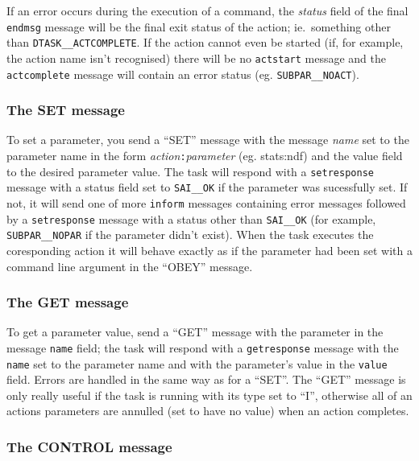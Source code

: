 \documentclass[twoside,11pt,nolof]{starlink}
\begin{document}
If an error occurs during the execution of a command, the \emph{status} field
of the final \texttt{endmsg} message will be the final exit status of the action;
ie.\ something other than \texttt{DTASK\_\_ACTCOMPLETE}. If the action cannot even
be started (if, for example, the action name isn't recognised) there will be
no \texttt{actstart} message and the \texttt{actcomplete} message will contain an
error status (eg. \texttt{SUBPAR\_\_NOACT}).

\subsubsection{The SET message}

To set a parameter, you send a ``SET'' message with the message \emph{name} set to the parameter name in the form \emph{action}{\tt{:}}\emph{parameter} (eg.  stats:ndf) and the value field to the desired
parameter value. The task will respond with a \texttt{setresponse} message
with a status field set to \texttt{SAI\_\_OK} if the parameter was
sucessfully set.  If not, it will send one of more \texttt{inform}
messages containing error messages followed by a \texttt{setresponse}
message with a status other than \texttt{SAI\_\_OK} (for example, \texttt{SUBPAR\_\_NOPAR} if the parameter didn't exist). When the task executes
the coresponding action it will behave exactly as if the parameter had
been set with a command line argument in the ``OBEY'' message.

\subsubsection{The GET message}

To get a parameter value, send a ``GET'' message with the parameter in the
message \texttt{name} field; the task will respond with a \texttt{getresponse}
message with the \texttt{name} set to the parameter name and with the
parameter's value in the \texttt{value} field. Errors are handled in the same
way as for a ``SET''. The ``GET'' message is only really useful if the task
is running with its type set to ``I'', otherwise all of an actions parameters
are annulled (set to have no value) when an action completes.

\subsubsection{The CONTROL message}
\end{document}

